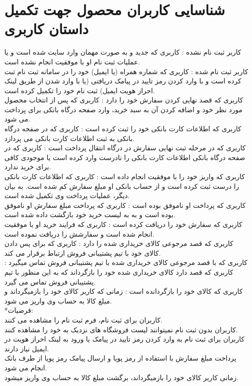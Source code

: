 \documentclass[12pt]{report}
\begin{document}
\section{ شناسایی کاربران محصول جهت تکمیل داستان کاربری}
کاربر ثبت نام نشده : کاربری که جدید و به صورت مهمان وارد سایت شده است و یا عملیات ثبت نام او با موفقیت انجام نشده است.\\
کاربر ثبت نام شده : کاربری که شماره همراه (یا ایمیل) خود را در سامانه ثبت نام ثبت کرده است و با وارد کردن رمز تایید در پیامک دریافتی (یا با وارد شدن از طریق لینک احراز هویت ایمیل) ثبت نام خود را تکمیل کرده است.\\
کاربری که قصد نهایی کردن سفارش خود را دارد : کاربری که پس از انتخاب محصول مورد نظر خود و اضافه کردن آن به سبد خرید، وارد صفحه درگاه بانکی برای پرداخت می شود.\\
کاربری که اطلاعات کارت بانکی خود را ثبت کرده است : کاربری که در صفحه درگاه بانکی به ثبت اطلاعات کارت بانکی می پردازد.\\
کاربری که در مرحله ثبت نهایی سفارش در درگاه انتقال پرداخت است : کاربری که در صفحه درگاه بانکی اطلاعات کارت بانکی را نادرست وارد کرده است یا موجودی کافی برای خرید ندارد.\\
کاربری که واریز خود را با موفقیت انجام داده است :  کاربری که اطلاعات کارت بانکی را درست ثبت کرده است و از حساب بانکی او مبلغ سفارش کم شده است. به بیان دیگر، عملیات پرداخت وی تکمیل شده است. \\
کاربری که پرداخت او ناموفق بوده است : کاربری که پرداخت مبلغ سفارش او ناموفق بوده است و به به لیست خرید خود بازگشت داده شده است.\\
کاربری که سفارش خود را دریافت کرده است : کاربری که فرایند خرید او با موفقیت انجام شده است و سفارشش را دریافت نموده است.\\
کاربری که قصد مرجوعی کالای خریداری شده را دارد : کاربری که برای پس دادن کالای خود با تیم پشتیبانی فروش ارتباط برقرار می کند.\\
کاربری که با قصد مرجوعی کالای خریداری شده با تیم پشتیبانی فروش تماس میگیرد : کاربری که قصد دارد کالای خریداری شده خود را بازگرداند که به این منظور با تیم پشتیبانی فروش تماس می گیرد.\\
کاربری که کالای خود را بازگردانده است : زمانی که کاربر کالای خود را بازمیگرداند و مبلغ کالا به حساب وی واریز می شود.\\
*فرضیات: \\
کاربران برای ثبت نام، فرم ثبت نام را مشاهده می کنند.\\
کاربران بدون ثبت نام نمیتوانند لیست فروشگاه های نزدیک به خود را مشاهده کنند.\\
کاربران برای ثبت نام به وارد کردن رمز تایید در پیامک یا ورود به لینک احراز هویت در ایمیل نیاز دارند.\\
پرداخت مبلغ سفارش با استفاده از رمز پویا و ارسال پیامک رمز پویا از طرف بانک انجام می شود.\\
زمانی کاربر کالای خود را بازمیگرداند، برگشت مبلغ کالا به حساب وی واریز میشود.\\
\end{document}
